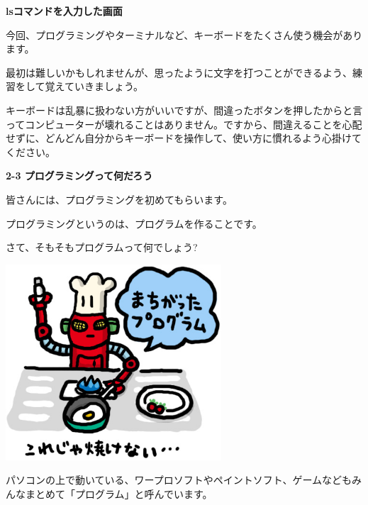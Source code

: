 \documentclass[a4paper,dvipdfmx]{jarticle}
\newcommand\textstyleqwerty[1]{#1}
\begin{document}
\bigskip


\bigskip


\bigskip


\bigskip


\bigskip

\textstyleqwerty{\textbf{lsコマンドを入力した画面}}


\bigskip


\bigskip


\bigskip


\bigskip


\bigskip

今回、プログラミングやターミナルなど、キーボードをたくさん使う機会があります。

最初は難しいかもしれませんが、思ったように文字を打つことができるよう、練習をして覚えていきましょう。

キーボードは乱暴に扱わない方がいいですが、間違ったボタンを押したからと言ってコンピューターが壊れることはありません。ですから、間違えることを心配せずに、どんどん自分からキーボードを操作して、使い方に慣れるよう心掛けてください。


\bigskip


\bigskip

{\bfseries
2-3 プログラミングって何だろう}


\bigskip

皆さんには、プログラミングを初めてもらいます。

プログラミングというのは、プログラムを作ることです。

\textstyleqwerty{さて、そもそもプログラムって何でしょう?}

\begin{center}
\includegraphics[width=8.031cm,height=7.304cm]{text02-img/text02-img006.jpg}

\end{center}
パソコンの上で動いている、ワープロソフトやペイントソフト、ゲームなどもみんなまとめて「プログラム」と呼んでいます。
\end{document}
